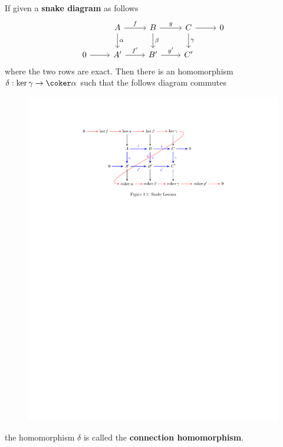 \begin{lemma}\label{snake lemma}
If given a \textbf{snake diagram} as follows
\[\begin{tikzcd}
&A\ar[r,"f"]\ar[d,"\alpha"]&B\ar[r,"g"]\ar[d,"\beta"]&C\ar[r]\ar[d,"\gamma"]&0\\
0\ar[r]&A'\ar[r,"f'"]&B'\ar[r,"g'"]&C'
\end{tikzcd}\]
where the two rows are exact. Then there is an homomorphism $\delta:\ker\gamma\to\coker\alpha$ such that the follows diagram commutes
\begin{figure}[!h]
\centering
\includegraphics{pictures/snake.pdf}
\end{figure}
the homomorphism $\delta$ is called the \textbf{connection homomorphism}.
\end{lemma}
